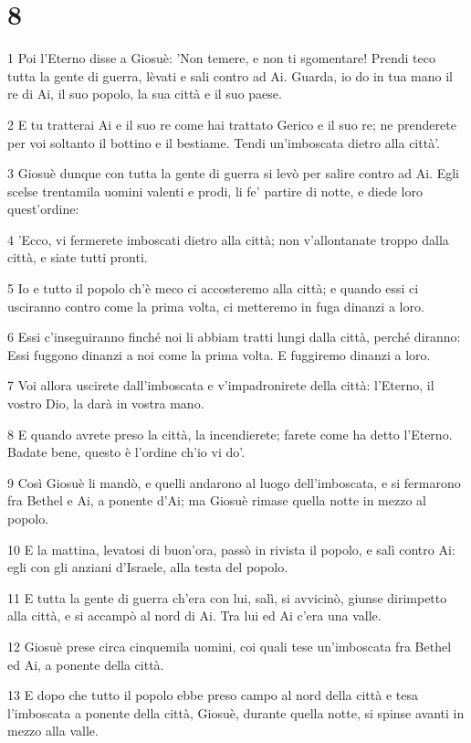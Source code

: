 \chapter{8}

\par 1 Poi l'Eterno disse a Giosuè: 'Non temere, e non ti sgomentare! Prendi teco tutta la gente di guerra, lèvati e sali contro ad Ai. Guarda, io do in tua mano il re di Ai, il suo popolo, la sua città e il suo paese.
\par 2 E tu tratterai Ai e il suo re come hai trattato Gerico e il suo re; ne prenderete per voi soltanto il bottino e il bestiame. Tendi un'imboscata dietro alla città'.
\par 3 Giosuè dunque con tutta la gente di guerra si levò per salire contro ad Ai. Egli scelse trentamila uomini valenti e prodi, li fe' partire di notte, e diede loro quest'ordine:
\par 4 'Ecco, vi fermerete imboscati dietro alla città; non v'allontanate troppo dalla città, e siate tutti pronti.
\par 5 Io e tutto il popolo ch'è meco ci accosteremo alla città; e quando essi ci usciranno contro come la prima volta, ci metteremo in fuga dinanzi a loro.
\par 6 Essi c'inseguiranno finché noi li abbiam tratti lungi dalla città, perché diranno: Essi fuggono dinanzi a noi come la prima volta. E fuggiremo dinanzi a loro.
\par 7 Voi allora uscirete dall'imboscata e v'impadronirete della città: l'Eterno, il vostro Dio, la darà in vostra mano.
\par 8 E quando avrete preso la città, la incendierete; farete come ha detto l'Eterno. Badate bene, questo è l'ordine ch'io vi do'.
\par 9 Così Giosuè li mandò, e quelli andarono al luogo dell'imboscata, e si fermarono fra Bethel e Ai, a ponente d'Ai; ma Giosuè rimase quella notte in mezzo al popolo.
\par 10 E la mattina, levatosi di buon'ora, passò in rivista il popolo, e salì contro Ai: egli con gli anziani d'Israele, alla testa del popolo.
\par 11 E tutta la gente di guerra ch'era con lui, salì, si avvicinò, giunse dirimpetto alla città, e si accampò al nord di Ai. Tra lui ed Ai c'era una valle.
\par 12 Giosuè prese circa cinquemila uomini, coi quali tese un'imboscata fra Bethel ed Ai, a ponente della città.
\par 13 E dopo che tutto il popolo ebbe preso campo al nord della città e tesa l'imboscata a ponente della città, Giosuè, durante quella notte, si spinse avanti in mezzo alla valle.
